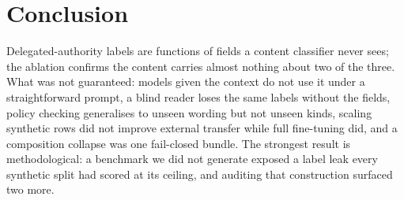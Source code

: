 \section{Conclusion}
\label{sec:conclusion}

Delegated-authority labels are functions of fields a content classifier
never sees; the ablation confirms the content carries almost nothing about
two of the three. What was not guaranteed: models
given the context do not use it under a straightforward prompt, a blind
reader loses the same labels without the fields, policy checking
generalises to unseen wording but not unseen kinds, scaling synthetic rows
did not improve external transfer while full fine-tuning did, and a
composition collapse was one fail-closed bundle. The strongest result is
methodological: a benchmark we did not generate exposed a label leak every
synthetic split had scored at its ceiling, and auditing that construction
surfaced two more.
